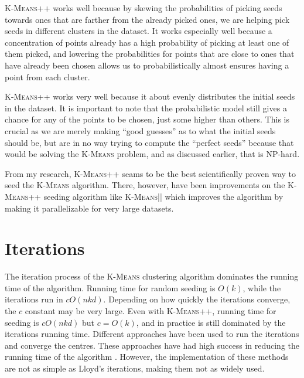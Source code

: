 \documentclass[12pt]{dalthesis}
\newcommand*{\kmeans}{\textsc{K-Means} } %
\newcommand*{\kmeansn}{\textsc{K-Means}} %
\begin{document}
\kmeansn++ works well because by skewing the probabilities of picking seeds towards ones that are farther from the already picked ones, we are helping pick seeds in different clusters in the dataset. It works especially well because a concentration of points already has a high probability of picking at least one of them picked, and lowering the probabilities for points that are close to ones that have already been chosen allows us to probabilistically almost ensures having a point from each cluster.

\kmeansn++ works very well because it about evenly distributes the initial seeds in the dataset. It is important to note that the probabilistic model still gives a chance for any of the points to be chosen, just some higher than others. This is crucial as we are merely making ``good guesses'' as to what the initial seeds should be, but are in no way trying to compute the ``perfect seeds'' because that would be solving the \kmeans problem, and as discussed earlier, that is NP-hard.

From my research, \kmeansn++ seams to be the best scientifically proven way to seed the \kmeans algorithm. There, however, have been improvements on the \kmeansn++ seeding algorithm like \kmeansn|| which improves the algorithm by making it parallelizable for very large datasets. 



\section{Iterations}

The iteration process of the \kmeans clustering algorithm dominates the running time of the algorithm. Running time for random seeding is $O(k)$, while the iterations run in $cO(nkd)$. Depending on how quickly the iterations converge, the $c$ constant may be very large. Even with \kmeansn++, running time for seeding is $cO(nkd)$ but $c=O(k)$, and in practice is still dominated by the iterations running time. 
Different approaches have been used to run the iterations and converge the centres. These approaches have had high success in reducing the running time of the algorithm \cite{alsabti1997efficient}. However, the implementation of these methods are not as simple as Lloyd's iterations, making them not as widely used.  
\end{document}
